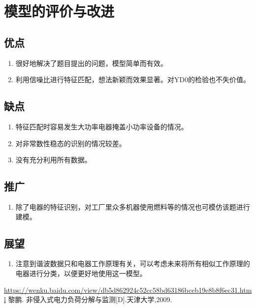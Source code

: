 \documentclass[UTF8]{article}
\begin{document}
\section{模型的评价与改进}
\subsection{优点}
\begin{enumerate}[1]
\item 很好地解决了题目提出的问题，模型简单而有效。
\item 利用信噪比进行特征匹配，想法新颖而效果显著。对YD0的检验也不失价值。
\end{enumerate}

\subsection{缺点}
\begin{enumerate}[1]
\item 特征匹配时容易发生大功率电器掩盖小功率设备的情况。
\item 对非常数性稳态的识别的情况较差。
\item 没有充分利用所有数据。
\end{enumerate}

\subsection{推广}
\begin{enumerate}[1]
\item 除了电器的特征识别，对工厂里众多机器使用燃料等的情况也可模仿该题进行建模。
\end{enumerate}

\subsection{展望}
\begin{enumerate}[1]
\item 注意到谐波数据只和电器工作原理有关，可以考虑未来将所有相似工作原理的电器进行分类，以便更好地使用这一模型。
\end{enumerate}

\newpage
\begin{thebibliography}{}
\url{https://wenku.baidu.com/view/db5d862924c52cc58bd63186bceb19e8b8f6ec31.html}
黎鹏. 非侵入式电力负荷分解与监测[D].天津大学,2009.
\end{thebibliography}
\end{document}
